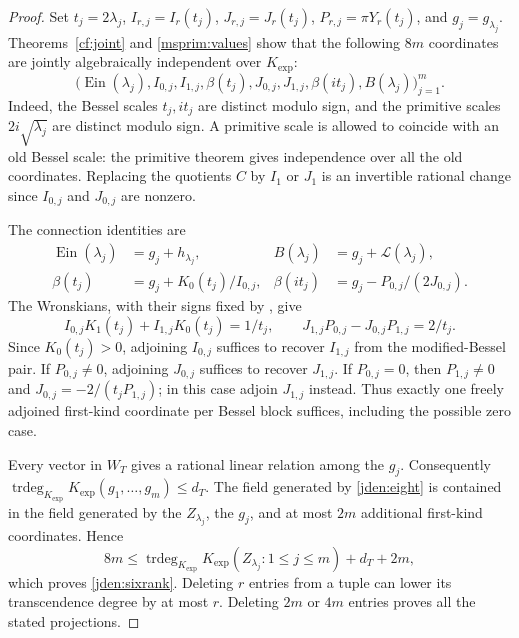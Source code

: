 \documentclass[11pt]{article}
\theoremstyle{definition}
\theoremstyle{remark}
\newcommand{\trdeg}{\operatorname{trdeg}}
\newcommand{\Ein}{\operatorname{Ein}}
\newcommand{\Kexp}{K_{\mathrm{exp}}}
\begin{document}
\begin{proof}
Set $t_j=2\lambda_j$, $I_{r,j}=I_r(t_j)$,
$J_{r,j}=J_r(t_j)$, $P_{r,j}=\pi Y_r(t_j)$, and
$g_j=g_{\lambda_j}$. Theorems~\ref{cf:joint} and
\ref{msprim:values} show that the following $8m$ coordinates are
jointly algebraically independent over $\Kexp$:
\begin{equation}\label{jden:eight}
 \bigl(\Ein(\lambda_j),I_{0,j},I_{1,j},\beta(t_j),
          J_{0,j},J_{1,j},\beta(it_j),B(\lambda_j)\bigr)_{j=1}^m.
\end{equation}
Indeed, the Bessel scales $t_j,it_j$ are distinct modulo sign, and the
primitive scales $2i\sqrt{\lambda_j}$ are distinct modulo sign.
A primitive scale is allowed to coincide with an old Bessel scale:
the primitive theorem gives independence over all the old coordinates.
Replacing the quotients $C$ by $I_1$ or $J_1$ is an invertible rational
change since $I_{0,j}$ and $J_{0,j}$ are nonzero.

The connection identities are
\begin{align}
 \Ein(\lambda_j)&=g_j+h_{\lambda_j},&
 B(\lambda_j)&=g_j+\mathcal L(\lambda_j),\label{jden:recovery1}\\
 \beta(t_j)&=g_j+K_0(t_j)/I_{0,j},&
 \beta(it_j)&=g_j-P_{0,j}/(2J_{0,j}).\label{jden:recovery2}
\end{align}
The Wronskians, with their signs fixed by
\cite[\S\S10.5, 10.28]{DLMF}, give
\begin{equation}\label{jden:wronskians}
 I_{0,j}K_1(t_j)+I_{1,j}K_0(t_j)=1/t_j,
 \qquad
 J_{1,j}P_{0,j}-J_{0,j}P_{1,j}=2/t_j.
\end{equation}
Since $K_0(t_j)>0$, adjoining $I_{0,j}$ suffices to recover $I_{1,j}$
from the modified-Bessel pair. If $P_{0,j}\ne0$, adjoining $J_{0,j}$
suffices to recover $J_{1,j}$. If $P_{0,j}=0$, then
$P_{1,j}\ne0$ and $J_{0,j}=-2/(t_jP_{1,j})$; in this case adjoin
$J_{1,j}$ instead. Thus exactly one freely adjoined first-kind
coordinate per Bessel block suffices, including the possible zero case.

Every vector in $W_T$ gives a rational linear relation among the $g_j$.
Consequently
$\trdeg_{\Kexp}\Kexp(g_1,\ldots,g_m)\le d_T$.
The field generated by \eqref{jden:eight} is contained in the field
generated by the $Z_{\lambda_j}$, the $g_j$, and at most $2m$
additional first-kind coordinates. Hence
\[
 8m\le
 \trdeg_{\Kexp}\Kexp(Z_{\lambda_j}:1\le j\le m)+d_T+2m,
\]
which proves \eqref{jden:sixrank}. Deleting $r$ entries from a tuple
can lower its transcendence degree by at most $r$. Deleting $2m$ or
$4m$ entries proves all the stated projections.
\end{proof}
\end{document}
